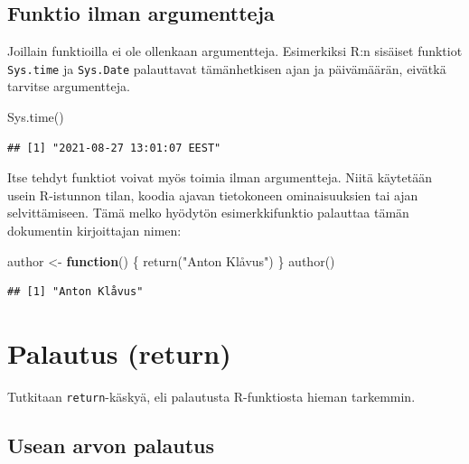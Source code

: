 \documentclass[
]{book}
\newenvironment{Shaded}{\begin{snugshade}}{\end{snugshade}}
\newcommand{\ControlFlowTok}[1]{\textcolor[rgb]{0.13,0.29,0.53}{\textbf{#1}}}
\newcommand{\FunctionTok}[1]{\textcolor[rgb]{0.00,0.00,0.00}{#1}}
\newcommand{\NormalTok}[1]{#1}
\newcommand{\OtherTok}[1]{\textcolor[rgb]{0.56,0.35,0.01}{#1}}
\newcommand{\StringTok}[1]{\textcolor[rgb]{0.31,0.60,0.02}{#1}}
\begin{document}
\hypertarget{funktio-ilman-argumentteja}{%
\subsection{Funktio ilman argumentteja}\label{funktio-ilman-argumentteja}}

Joillain funktioilla ei ole ollenkaan argumentteja. Esimerkiksi R:n sisäiset funktiot \texttt{Sys.time} ja \texttt{Sys.Date} palauttavat tämänhetkisen ajan ja päivämäärän, eivätkä tarvitse argumentteja.

\begin{Shaded}
\begin{Highlighting}[]
\FunctionTok{Sys.time}\NormalTok{()}
\end{Highlighting}
\end{Shaded}

\begin{verbatim}
## [1] "2021-08-27 13:01:07 EEST"
\end{verbatim}

Itse tehdyt funktiot voivat myös toimia ilman argumentteja. Niitä käytetään usein R-istunnon tilan, koodia ajavan tietokoneen ominaisuuksien tai ajan selvittämiseen. Tämä melko hyödytön esimerkkifunktio palauttaa tämän dokumentin kirjoittajan nimen:

\begin{Shaded}
\begin{Highlighting}[]
\NormalTok{author }\OtherTok{\textless{}{-}} \ControlFlowTok{function}\NormalTok{() \{}
  \FunctionTok{return}\NormalTok{(}\StringTok{"Anton Klåvus"}\NormalTok{)}
\NormalTok{\}}
\FunctionTok{author}\NormalTok{()}
\end{Highlighting}
\end{Shaded}

\begin{verbatim}
## [1] "Anton Klåvus"
\end{verbatim}

\hypertarget{palautus-return}{%
\section{Palautus (return)}\label{palautus-return}}

Tutkitaan \texttt{return}-käskyä, eli palautusta R-funktiosta hieman tarkemmin.

\hypertarget{usean-arvon-palautus}{%
\subsection{Usean arvon palautus}\label{usean-arvon-palautus}}
\end{document}
